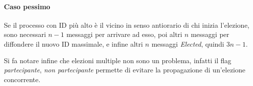 \paragraph{Caso pessimo}
Se il processo con ID più alto è il vicino in senso antiorario 
di chi inizia l'elezione, sono necessari $n-1$ messaggi per arrivare ad esso, 
poi altri $n$ messaggi per diffondere il nuovo ID massimale, 
e infine altri $n$ messaggi \emph{Elected}, quindi $3n-1$.

Si fa notare infine che elezioni multiple non sono un problema, infatti 
il flag \emph{partecipante}, \emph{non partecipante} permette di evitare la propagazione 
di un'elezione concorrente.